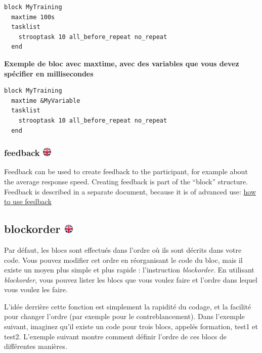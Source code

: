 \documentclass[
]{book}
\begin{document}
\begin{verbatim}
block MyTraining
  maxtime 100s
  tasklist
    strooptask 10 all_before_repeat no_repeat
  end
\end{verbatim}

\textbf{Exemple de bloc avec maxtime, avec des variables que vous devez
spécifier en millisecondes}

\begin{verbatim}
block MyTraining
  maxtime &MyVariable
  tasklist
    strooptask 10 all_before_repeat no_repeat
  end
\end{verbatim}

\hypertarget{feedback}{%
\subsubsection[feedback ]{\texorpdfstring{feedback
\href{https://www.psytoolkit.org/doc3.2.0/syntax.html\#block-feedback}{\protect\includegraphics{img/ukflag.png}}}{feedback }}\label{feedback}}

Feedback can be used to create feedback to the participant, for example
about the average response speed. Creating feedback is part of the
``block'' structure. Feedback is described in a separate document,
because it is of advanced use:
\href{https://www.psytoolkit.org/doc3.1.0/feedback.html}{how to use
feedback}

\hypertarget{blockorder}{%
\subsection[blockorder ]{\texorpdfstring{blockorder
\href{https://www.psytoolkit.org/doc3.2.0/syntax.html\#blockorder}{\protect\includegraphics{img/ukflag.png}}}{blockorder }}\label{blockorder}}

Par défaut, les blocs sont effectués dans l'ordre où ils sont décrits
dans votre code. Vous pouvez modifier cet ordre en réorganisant le code
du bloc, mais il existe un moyen plus simple et plus rapide :
l'instruction \emph{blockorder}. En utilisant \emph{blockorder}, vous
pouvez lister les blocs que vous voulez faire et l'ordre dans lequel
vous voulez les faire.

L'idée derrière cette fonction est simplement la rapidité du codage, et
la facilité pour changer l'ordre (par exemple pour le contreblancement).
Dans l'exemple suivant, imaginez qu'il existe un code pour trois blocs,
appelés formation, test1 et test2. L'exemple suivant montre comment
définir l'ordre de ces blocs de différentes manières.
\end{document}
